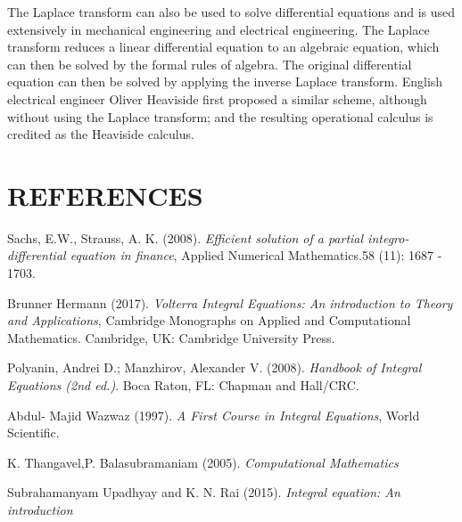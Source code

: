 \documentclass[11pt]{report}
\begin{document}
	The Laplace transform can also be used to solve differential equations and is used extensively in mechanical engineering and electrical engineering. The Laplace transform reduces a linear differential equation to an algebraic equation, which can then be solved by the formal rules of algebra. The original differential equation can then be solved by applying the inverse Laplace transform. English electrical engineer Oliver Heaviside first proposed a similar scheme, although without using the Laplace transform; and the resulting operational calculus is credited as the Heaviside calculus.
 
	
	\chapter*{REFERENCES}
	
	\begin{description}
		\item Sachs, E.W., Strauss, A. K. (2008). \emph{Efficient solution of a partial integro-differential equation in finance}, Applied Numerical Mathematics.58 (11): 1687 - 1703.
		
		\item Brunner Hermann (2017). \emph{Volterra Integral Equations: An introduction to Theory and Applications}, Cambridge Monographs on Applied and Computational Mathematics. Cambridge, UK: Cambridge University Press.
		
		\item Polyanin, Andrei D.; Manzhirov, Alexander V. (2008).
		\emph{Handbook of Integral Equations (2nd ed.)}. Boca Raton, FL: Chapman and Hall/CRC.
		
		\item Abdul- Majid Wazwaz (1997). \emph{A First Course in Integral Equations}, World Scientific.
		
		\item K. Thangavel,P. Balasubramaniam (2005). \emph{Computational Mathematics}
		
		\item Subrahamanyam Upadhyay and K. N. Rai (2015). \emph{Integral equation: An introduction}
	\end{description}
	
\end{document}
